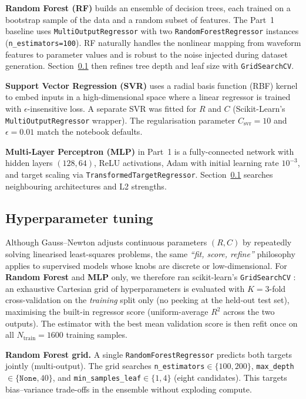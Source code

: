 \documentclass[journal,twocolumn]{IEEEtran}
\begin{document}
\textbf{Random Forest (RF)} builds an ensemble of decision trees, each trained on a bootstrap sample of the data and a random subset of features. The Part~1 baseline uses \texttt{MultiOutputRegressor} with two \texttt{RandomForestRegressor} instances (\texttt{n\_estimators=100}). RF naturally handles the nonlinear mapping from waveform features to parameter values and is robust to the noise injected during dataset generation. Section~\ref{sec:hpo} then refines tree depth and leaf size with \texttt{GridSearchCV}.

\textbf{Support Vector Regression (SVR)} uses a radial basis function (RBF) kernel to embed inputs in a high-dimensional space where a linear regressor is trained with $\epsilon$-insensitive loss. A separate SVR was fitted for $R$ and $C$ (Scikit-Learn's \texttt{MultiOutputRegressor} wrapper). The regularisation parameter $C_{\text{svr}}=10$ and $\epsilon=0.01$ match the notebook defaults.

\textbf{Multi-Layer Perceptron (MLP)} in Part~1 is a fully-connected network with hidden layers $(128,64)$, ReLU activations, Adam with initial learning rate $10^{-3}$, and target scaling via \texttt{TransformedTargetRegressor}. Section~\ref{sec:hpo} searches neighbouring architectures and L2 strengths.

\subsection{Hyperparameter tuning}
\label{sec:hpo}

Although Gauss--Newton adjusts continuous parameters $(R,C)$ by repeatedly solving linearised least-squares problems, the same \emph{``fit, score, refine''} philosophy applies to supervised models whose knobs are discrete or low-dimensional. For \textbf{Random Forest} and \textbf{MLP} only, we therefore ran scikit-learn's \texttt{GridSearchCV} \cite{pedregosa2011}: an exhaustive Cartesian grid of hyperparameters is evaluated with $K{=}3$-fold cross-validation on the \emph{training} split only (no peeking at the held-out test set), maximising the built-in regressor score (uniform-average $R^2$ across the two outputs). The estimator with the best mean validation score is then refit once on all $N_{\text{train}}=1600$ training samples.

\textbf{Random Forest grid.} A single \texttt{RandomForestRegressor} predicts both targets jointly (multi-output). The grid searches \texttt{n\_estimators}$\in\{100,200\}$, \texttt{max\_depth}$\in\{\texttt{None},40\}$, and \texttt{min\_samples\_leaf}$\in\{1,4\}$ (eight candidates). This targets bias--variance trade-offs in the ensemble without exploding compute.
\end{document}
